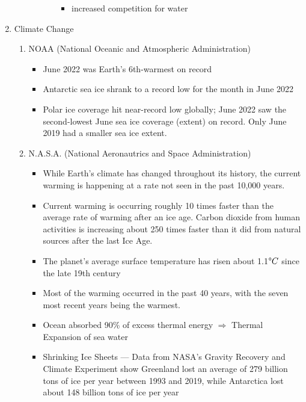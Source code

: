 \documentclass[oneside]{book}
\begin{document}
\begin{enumerate}
\begin{enumerate}
\begin{enumerate}
\begin{itemize}
\begin{itemize}
                    \item increased competition for water
                \end{itemize}
            \end{itemize}
        \end{enumerate}
    \end{enumerate}
    \item Climate Change
    \begin{enumerate}
        \item NOAA (National Oceanic and Atmospheric Administration) \begin{itemize}
            \item June 2022 was Earth’s 6th-warmest on record
            \item Antarctic sea ice shrank to a record low for the month in June 2022
            \item Polar ice coverage hit near-record low globally; June 2022 saw the second-lowest June sea ice coverage (extent) on record. Only June 2019 had a smaller sea ice extent. 
        \end{itemize}
        \item N.A.S.A. (National Aeronautrics and Space Administration) \begin{itemize}
            \item \footnotesize While Earth’s climate has changed throughout its history, \normalsize the current warming is happening at a rate not seen in the past 10,000 years.
            \item Current warming is occurring roughly 10 times faster than the average rate of warming after an ice age. Carbon dioxide from human activities is increasing about 250 times faster than it did from natural sources after the last Ice Age.
            \item The planet's average surface temperature has risen about 1.1\(\text{\degree} C\) since the late 19th century
            \item Most of the warming occurred in the past 40 years, with the seven most recent years being the warmest.
            \item Ocean absorbed 90\% of excess thermal energy \( \Rightarrow \) Thermal Expansion of sea water
            \item Shrinking Ice Sheets --- Data from NASA's Gravity Recovery and Climate Experiment show Greenland lost an average of 279 billion tons of ice per year between 1993 and 2019, while Antarctica lost about 148 billion tons of ice per year

\end{itemize}
\end{enumerate}
\end{enumerate}
\end{document}

